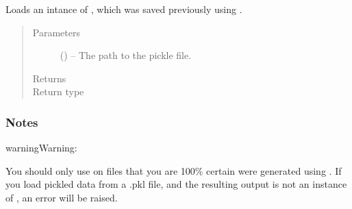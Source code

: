 \documentclass[letterpaper,10pt,english]{sphinxmanual}
\begin{document}
\begin{fulllineitems}
\begin{fulllineitems}
\label{\detokenize{references/core:nmrespy.core.Estimator.from_pickle}}
\sphinxAtStartPar
Loads an intance of {\hyperref[\detokenize{references/core:nmrespy.core.Estimator}]{}}, which was saved
previously using {\hyperref[\detokenize{references/core:nmrespy.core.Estimator.to_pickle}]{}}.
\begin{quote}\begin{description}
\item[{Parameters}] \leavevmode
\sphinxAtStartPar
{} () – The path to the pickle file. 

\item[{Returns}] \leavevmode
\sphinxAtStartPar
{}

\item[{Return type}] \leavevmode
\sphinxAtStartPar
{\hyperref[\detokenize{references/core:nmrespy.core.Estimator}]{}}

\end{description}\end{quote}
\subsubsection*{Notes}

\begin{sphinxadmonition}{warning}{Warning:}
\sphinxAtStartPar
{}

\sphinxAtStartPar
{}

\sphinxAtStartPar
You should only use {\hyperref[\detokenize{references/core:nmrespy.core.Estimator.from_pickle}]{}} on files that
you are 100\% certain were generated using
{\hyperref[\detokenize{references/core:nmrespy.core.Estimator.to_pickle}]{}}. If you load pickled data from a .pkl file,
and the resulting output is not an instance of
{\hyperref[\detokenize{references/core:nmrespy.core.Estimator}]{}}, an error will be raised.
\end{sphinxadmonition}


\end{fulllineitems}
\end{fulllineitems}
\end{document}
